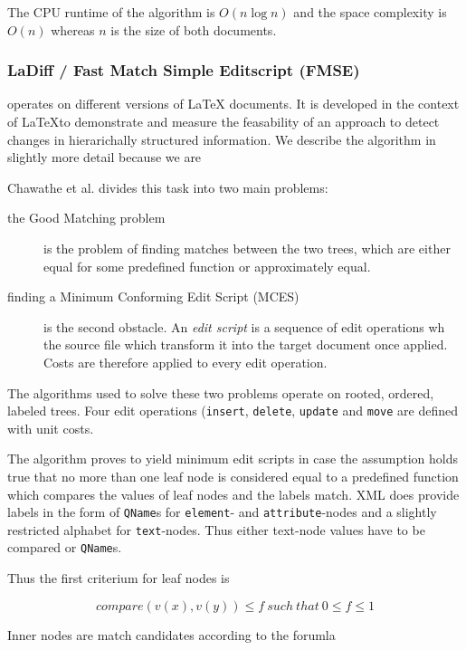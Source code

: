 The CPU runtime of the algorithm is $O(n \log n)$ and the space complexity is $O(n)$ whereas $n$ is the size of both documents.

\subsubsection{LaDiff / Fast Match Simple Editscript (FMSE)\cite{chawathe1996change}}\label{subsec::ladiff}
operates on different versions of LaTeX documents. It is developed in the context of \LaTeX to demonstrate and measure the feasability of an approach to detect changes in hierarichally structured information. We describe the algorithm in slightly more detail because we are 

Chawathe et al. divides this task into two main problems:

\begin{description}
\item[the Good Matching problem] is the problem of finding matches between the two trees, which are either equal for some predefined function or approximately equal.
\item[finding a Minimum Conforming Edit Script (MCES)] is the second obstacle. An \emph{edit script} is a sequence of edit operations wh the source file which transform it into the target document once applied. Costs are therefore applied to every edit operation.
\end{description}

The algorithms used to solve these two problems operate on rooted, ordered, labeled trees. Four edit operations (\texttt{insert}, \texttt{delete}, \texttt{update} and \texttt{move} are defined with unit costs.

The algorithm proves to yield minimum edit scripts in case the assumption holds true that no more than one leaf node is considered equal to a predefined function which compares the values of leaf nodes and the labels match. XML does provide labels in the form of \texttt{QName}s for \texttt{element}- and \texttt{attribute}-nodes and a slightly restricted alphabet for \texttt{text}-nodes. Thus either text-node values have to be compared or \texttt{QName}s.

Thus the first criterium for leaf nodes is 

\begin{equation} 
compare(v(x), v(y)) \leq f\ such\ that\ 0 \leq f \leq 1
\end{equation}

Inner nodes are match candidates according to the forumla 

